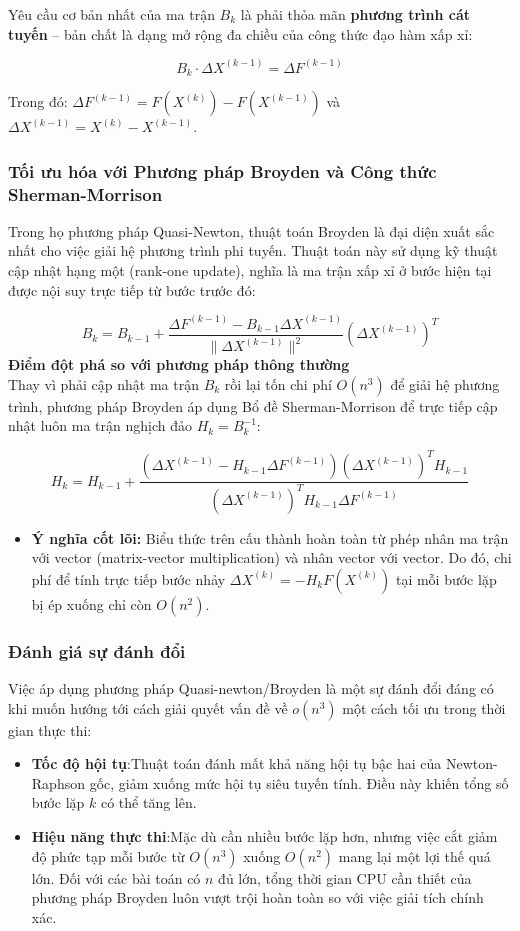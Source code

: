 Yêu cầu cơ bản nhất của ma trận $B_k$ là phải thỏa mãn \textbf{phương trình cát tuyến } – bản chất là dạng mở rộng đa chiều của công thức đạo hàm xấp xỉ:

\[
B_k \cdot \Delta X^{(k-1)} = \Delta F^{(k-1)}
\]

Trong đó: $\Delta F^{(k-1)} = F(X^{(k)}) - F(X^{(k-1)})$ và $\Delta X^{(k-1)} = X^{(k)} - X^{(k-1)}$.
\subsubsection*{ Tối ưu hóa với Phương pháp Broyden và Công thức Sherman-Morrison}

Trong họ phương pháp Quasi-Newton, thuật toán Broyden là đại diện xuất sắc nhất cho việc giải hệ phương trình phi tuyến. Thuật toán này sử dụng kỹ thuật cập nhật hạng một (rank-one update), nghĩa là ma trận xấp xỉ ở bước hiện tại được nội suy trực tiếp từ bước trước đó:

\[
B_k = B_{k-1} + \frac{\Delta F^{(k-1)} - B_{k-1} \Delta X^{(k-1)}}{\|\Delta X^{(k-1)}\|^2} (\Delta X^{(k-1)})^T
\]
\textbf{Điểm đột phá so với phương pháp thông thường}\\
Thay vì phải cập nhật ma trận $B_k$ rồi lại tốn chi phí $O(n^3)$ để giải hệ phương trình, phương pháp Broyden áp dụng Bổ đề Sherman-Morrison để trực tiếp cập nhật luôn ma trận nghịch đảo $H_k = B_k^{-1}$:

\[
H_k = H_{k-1} + \frac{(\Delta X^{(k-1)} - H_{k-1} \Delta F^{(k-1)}) (\Delta X^{(k-1)})^T H_{k-1}}{(\Delta X^{(k-1)})^T H_{k-1} \Delta F^{(k-1)}}
\]

\begin{itemize}
    \item \textbf{Ý nghĩa cốt lõi:} Biểu thức trên cấu thành hoàn toàn từ phép nhân ma trận với vector (matrix-vector multiplication) và nhân vector với vector. Do đó, chi phí để tính trực tiếp bước nhảy $\Delta X^{(k)} = -H_k F(X^{(k)})$ tại mỗi bước lặp bị ép xuống chỉ còn $O(n^2)$.
\end{itemize}
\subsubsection{Đánh giá sự đánh đổi}

Việc áp dụng phương pháp Quasi-newton/Broyden là một sự đánh đổi đáng có khi muốn hướng tới cách giải quyết vấn đề về $o(n^3)$ một cách tối ưu trong thời gian thực thi:
\begin{itemize}
    \item\textbf{Tốc độ hội tụ}:Thuật toán đánh mất khả năng hội tụ bậc hai của Newton-Raphson gốc, giảm xuống mức hội tụ siêu tuyến tính. Điều này khiến tổng số bước lặp $k$ có thể tăng lên.
    \item\textbf{Hiệu năng thực thi}:Mặc dù cần nhiều bước lặp hơn, nhưng việc cắt giảm độ phức tạp mỗi bước từ $O(n^3)$ xuống $O(n^2)$ mang lại một lợi thế quá lớn. Đối với các bài toán có $n$ đủ lớn, tổng thời gian CPU cần thiết  của phương pháp Broyden luôn vượt trội hoàn toàn so với việc giải tích chính xác.
\end{itemize}
